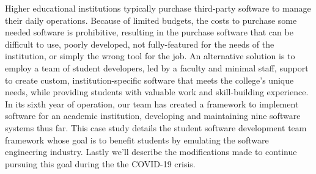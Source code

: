 Higher educational institutions typically purchase third-party software to manage their daily operations. Because of limited budgets, the costs to purchase some needed software is prohibitive, resulting in the purchase software that can be difficult to use, poorly developed, not fully-featured for the needs of the institution, or simply the wrong tool for the job. An alternative solution is to employ a team of student developers, led by a faculty and minimal staff, support to create custom, institution-specific software that meets the college's unique needs, while providing students with valuable work and skill-building experience. In its sixth year of operation, our team has created a framework to implement software for an academic institution, developing and maintaining nine software systems thus far. This case study details the student software development team framework whose goal is to benefit students by emulating the software engineering industry. Lastly we'll describe the modifications made to continue pursuing this goal during the the COVID-19 crisis.
